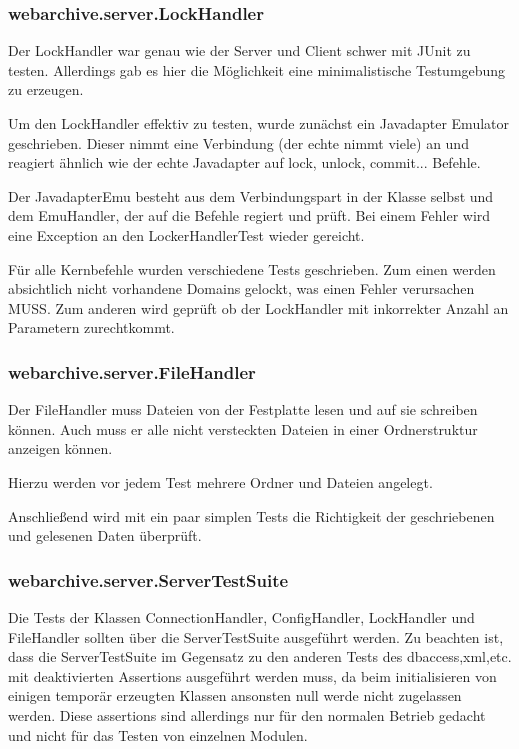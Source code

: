 	\subsubsection{webarchive.server.LockHandler}
		Der LockHandler war genau wie der Server und Client schwer mit JUnit zu testen.
		Allerdings gab es hier die Möglichkeit eine minimalistische Testumgebung zu erzeugen.
		
		Um den LockHandler effektiv zu testen, wurde zunächst ein Javadapter Emulator geschrieben.
		Dieser nimmt eine Verbindung (der echte nimmt viele) an und reagiert ähnlich wie der echte Javadapter auf lock, unlock, commit... Befehle.
		
		Der JavadapterEmu besteht aus dem Verbindungspart in der Klasse selbst und dem EmuHandler, der auf die Befehle regiert und prüft. 
		Bei einem Fehler wird eine Exception an den LockerHandlerTest wieder gereicht.
		
		Für alle Kernbefehle wurden verschiedene Tests geschrieben. 
		Zum einen werden absichtlich nicht vorhandene Domains gelockt, was einen Fehler verursachen MUSS.
		Zum anderen wird geprüft ob der LockHandler mit inkorrekter Anzahl an Parametern zurechtkommt.
	\subsubsection{webarchive.server.FileHandler}
		Der FileHandler muss Dateien von der Festplatte lesen und auf sie schreiben können.
		Auch muss er alle nicht versteckten Dateien in einer Ordnerstruktur anzeigen können.
		
		Hierzu werden vor jedem Test mehrere Ordner und Dateien angelegt.
		
		Anschließend wird mit ein paar simplen Tests die Richtigkeit der geschriebenen und gelesenen Daten überprüft.
		
	\subsubsection{webarchive.server.ServerTestSuite}
		Die Tests der Klassen ConnectionHandler, ConfigHandler, LockHandler und FileHandler sollten über die ServerTestSuite ausgeführt werden.
		Zu beachten ist, dass die ServerTestSuite im Gegensatz zu den anderen Tests des dbaccess,xml,etc. mit deaktivierten Assertions ausgeführt werden muss, da beim initialisieren von einigen temporär erzeugten Klassen ansonsten null werde nicht zugelassen werden.
		Diese assertions sind allerdings nur für den normalen Betrieb gedacht und nicht für das Testen von einzelnen Modulen.
		